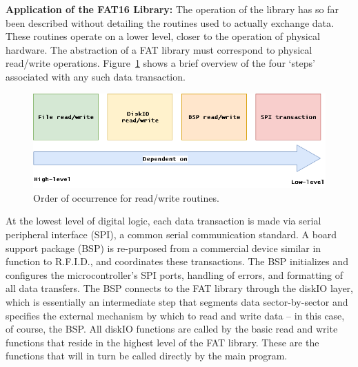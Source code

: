 

\label{ssss:FAT_application}
\textbf{Application of the FAT16 Library:} The operation of the library has so far been described without detailing the routines used to actually exchange data. These routines operate on a lower level, closer to the operation of physical hardware.  The abstraction of a FAT library must correspond to physical read/write operations. Figure~\ref{fig:FAT_readwrite} shows a brief overview of the four `steps' associated with any such data transaction. 

\begin{figure}[H]
    \centering
    \includegraphics[width=1\textwidth]{Figures/4_details/FAT-RWflow.png} 
    \caption{Order of occurrence for read/write routines.}
    \label{fig:FAT_readwrite}
\end{figure}

At the lowest level of digital logic, each data transaction is made via serial peripheral interface (SPI), a common serial communication standard. A board support package (BSP) is re-purposed from a commercial device similar in function to R.F.I.D., and coordinates these transactions. The BSP initializes and configures the microcontroller's SPI ports, handling of errors, and formatting of all data transfers. The BSP connects to the FAT library through the diskIO layer, which is essentially an intermediate step that segments data sector-by-sector and specifies the external mechanism by which to read and write data -- in this case, of course, the BSP. All diskIO functions are called by the basic read and write functions that reside in the highest level of the FAT library. These are the functions that will in turn be called directly by the main program.

